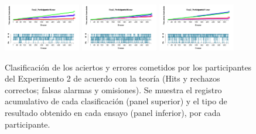 \documentclass[a4paper ]{article}
\begin{document}
\begin{figure}[th]
\includegraphics[width=0.3\textwidth]{Figures/Outcome_Exp2_P19} \includegraphics[width=0.3\textwidth]{Figures/Outcome_Exp2_P20} \includegraphics[width=0.3\textwidth]{Figures/Outcome_Exp2_P21} 
\caption[Resultados obtenidos por ensayo; Experimento 2]{Clasificación de los aciertos y errores cometidos por los participantes del Experimento 2 de acuerdo con la teoría (Hits y rechazos correctos; falsas alarmas y omisiones). Se muestra el registro acumulativo de cada clasificación (panel superior) y el tipo de resultado obtenido en cada ensayo (panel inferior), por cada participante.}
\label{fig:Outcome_E2}
\end{figure}
\end{document}

